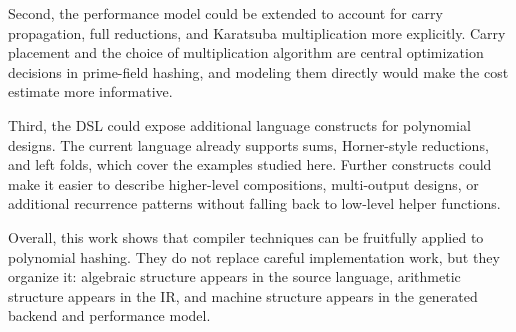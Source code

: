 Second, the performance model could be extended to account for carry propagation, full reductions, and Karatsuba multiplication more explicitly. Carry placement and the choice of multiplication algorithm are central optimization decisions in prime-field hashing, and modeling them directly would make the cost estimate more informative.

Third, the DSL could expose additional language constructs for polynomial designs. The current language already supports sums, Horner-style reductions, and left folds, which cover the examples studied here. Further constructs could make it easier to describe higher-level compositions, multi-output designs, or additional recurrence patterns without falling back to low-level helper functions.

Overall, this work shows that compiler techniques can be fruitfully applied to polynomial hashing. They do not replace careful implementation work, but they organize it: algebraic structure appears in the source language, arithmetic structure appears in the IR, and machine structure appears in the generated backend and performance model.
